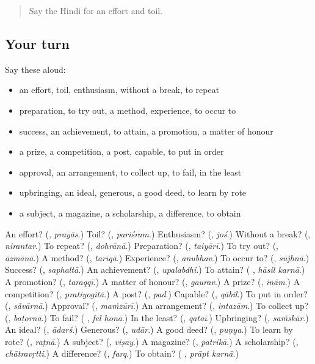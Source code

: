 \begin{quote}
Say the Hindi for an effort and toil.
\end{quote}

\subsection*{Your turn}
Say these aloud:

\begin{itemize}
\raggedright
  \item an effort, toil, enthusiasm, without a break, to repeat
  \item preparation, to try out, a method, experience, to occur to
  \item success, an achievement, to attain, a promotion, a matter of honour
  \item a prize, a competition, a post, capable, to put in order
  \item approval, an arrangement, to collect up, to fail, in the least
  \item upbringing, an ideal, generous, a good deed, to learn by rote
  \item a subject, a magazine, a scholarship, a difference, to obtain
\end{itemize}

\begin{tcolorbox}[breakable,colback=teal!4,colframe=teal!35!black,title={Before you move on}]
An effort? (\textbf{}, \emph{prayās}.) Toil? (\textbf{}, \emph{pariśram}.) Enthusiasm? (\textbf{}, \emph{joś}.) Without a break? (\textbf{}, \emph{nirantar}.) To repeat? (\textbf{}, \emph{dohrānā}.) Preparation? (\textbf{}, \emph{taiyārī}.) To try out? (\textbf{}, \emph{āzmānā}.) A method? (\textbf{}, \emph{tarīqā}.) Experience? (\textbf{}, \emph{anubhav}.) To occur to? (\textbf{}, \emph{sūjhnā}.) Success? (\textbf{}, \emph{saphaltā}.) An achievement? (\textbf{}, \emph{upalabdhi}.) To attain? (\textbf{ }, \emph{hāsil karnā}.) A promotion? (\textbf{}, \emph{taraqqī}.) A matter of honour? (\textbf{}, \emph{gaurav}.) A prize? (\textbf{}, \emph{inām}.) A competition? (\textbf{}, \emph{pratiyogitā}.) A post? (\textbf{}, \emph{pad}.) Capable? (\textbf{}, \emph{qābil}.) To put in order? (\textbf{}, \emph{sãvārnā}.) Approval? (\textbf{}, \emph{maṁzūrī}.) An arrangement? (\textbf{}, \emph{intazām}.) To collect up? (\textbf{}, \emph{baṭornā}.) To fail? (\textbf{ }, \emph{fel honā}.) In the least? (\textbf{}, \emph{qataī}.) Upbringing? (\textbf{}, \emph{saṁskār}.) An ideal? (\textbf{}, \emph{ādarś}.) Generous? (\textbf{}, \emph{udār}.) A good deed? (\textbf{}, \emph{puṇya}.) To learn by rote? (\textbf{}, \emph{raṭnā}.) A subject? (\textbf{}, \emph{viṣay}.) A magazine? (\textbf{}, \emph{patrikā}.) A scholarship? (\textbf{}, \emph{chātravṛtti}.) A difference? (\textbf{}, \emph{farq}.) To obtain? (\textbf{ }, \emph{prāpt karnā}.)
\end{tcolorbox}
